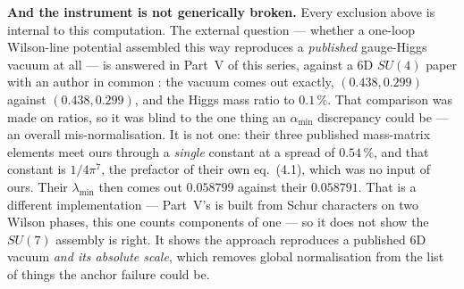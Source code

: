 \documentclass[11pt,a4paper]{article}
\newcommand{\su}[1]{SU(#1)}
\newcommand{\amin}{\alpha_{\min}}
\begin{document}
\textbf{And the instrument is not generically broken.} Every exclusion above is internal to this
computation. The external question --- whether a one-loop Wilson-line potential assembled this way
reproduces a \emph{published} gauge-Higgs vacuum at all --- is answered in Part~V of this series,
against a 6D $\su4$ paper with an author in common \cite{AHMN}: the vacuum comes out exactly,
$(0.438,0.299)$ against $(0.438,0.299)$, and the Higgs mass ratio to $0.1\,\%$. That comparison was
made on ratios, so it was blind to the one thing an $\amin$ discrepancy could be --- an overall
mis-normalisation. It is not one: their three published mass-matrix elements meet ours through a
\emph{single} constant at a spread of $0.54\,\%$, and that constant is $1/4\pi^7$, the prefactor of
their own eq.~(4.1), which was no input of ours. Their $\lambda_{\min}$ then comes out $0.058799$
against their $0.058791$. That is a different implementation --- Part~V's is built from Schur
characters on two Wilson phases, this one counts components of one --- so it does not show the
$\su7$ assembly is right. It shows the approach reproduces a published 6D vacuum \emph{and its
absolute scale}, which removes global normalisation from the list of things the anchor failure could
be.
\end{document}
